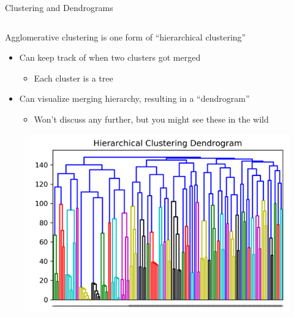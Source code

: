 \documentclass[aspectratio=169]{../latex_main/tntbeamer}  %
\begin{document}
	
	
	\begin{frame}{Clustering and Dendrograms}
	    \begin{columns}
	        \begin{column}{.7\textwidth}
	                Agglomerative clustering is one form of “hierarchical clustering”
	                \begin{itemize}
	                    \item Can keep track of when two clusters got merged 
	                    \begin{itemize}
	                        \item Each cluster is a tree
	                    \end{itemize}
	                    \item Can visualize merging hierarchy, resulting in a “dendrogram”
	                    \begin{itemize}
	                        \item Won’t discuss any further, but you might see these in the wild
	                    \end{itemize}
	                \end{itemize}
	                \begin{figure}
	                    \centering
	                    \includegraphics[scale=.6]{Bild52}
	                \end{figure}
	        \end{column}
	        

\end{columns}
\end{frame}
\end{document}
